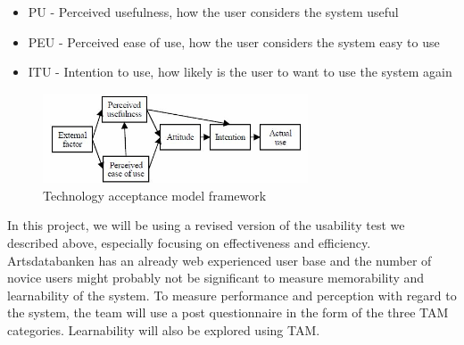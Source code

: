 \begin{itemize}
\item PU - Perceived usefulness, how the user considers the system useful

\item PEU - Perceived ease of use, how the user considers the system easy to use
\item ITU - Intention to use, how likely is the user to want to use the system again
\end{itemize}

\begin{figure}[htb]
	\centering
	\includegraphics[width=0.7\textwidth]{reqspec/tam.png}
	\caption{Technology acceptance model framework\cite{tam:doc4}}
	\label{fig:tam}
\end{figure}

In this project, we will be using a revised version of the usability test we described above, especially focusing on effectiveness and efficiency. Artsdatabanken has an already web experienced user base and the number of novice users might probably not be significant to measure memorability and learnability of the system.
To measure performance and perception with regard to the system, the team will use a post questionnaire in the form of the three TAM categories. Learnability will also be explored using TAM.

\newpage
